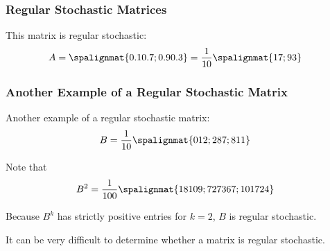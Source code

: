 \begin{frame}\frametitle{Regular Stochastic Matrices}

    \begin{center}\end{center}
    
    \vspace{12pt}
    \pause 
    
    This matrix is regular stochastic:
    \begin{align*}
        A &= \spalignmat{0.1 0.7;0.9 0.3} = \frac{1}{10} \spalignmat{1 7;9 3} 
    \end{align*}
    
\end{frame}


\begin{frame}\frametitle{Another Example of a Regular Stochastic Matrix}

    Another example of a regular stochastic matrix:
    \begin{align*}
        B & = \frac{1}{10}\spalignmat{0 1 2;2 8 7;8 1 1} 
    \end{align*}
    
    \pause 
    
    Note that
    \begin{align*}
        B^2 & = \frac{1}{100}\spalignmat{18 10 9;72 73 67;10 17 24} 
    \end{align*}
    
    \pause 
    Because $B^k$ has strictly positive entries for $k=2$, $B$ is regular stochastic. 
    
    \vspace{6pt}
    \pause
    It can be very difficult to determine whether a matrix is regular stochastic. 
\end{frame}



